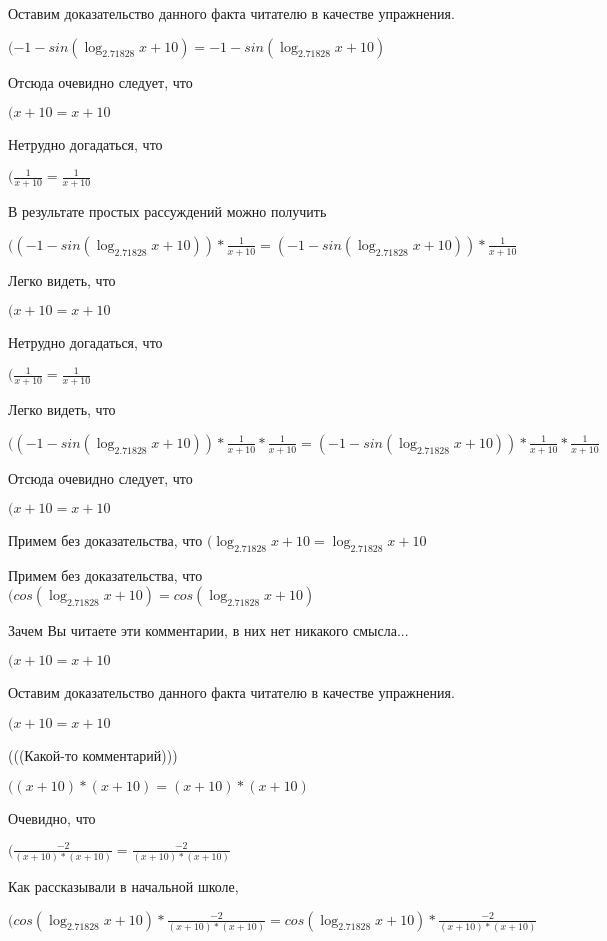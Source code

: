 \documentclass[12pt,a4paper,fleqn]{article}
\theoremstyle{definition}
\begin{document}
Оставим доказательство данного факта читателю в качестве упражнения.

$( -1  - sin(\log_{ 2.71828 }{ x  +  10 }) =  -1  - sin(\log_{ 2.71828 }{ x  +  10 })$

Отсюда очевидно следует, что

$( x  +  10  =  x  +  10 $

Нетрудно догадаться, что

$(\frac{ 1 }{ x  +  10 }
 = \frac{ 1 }{ x  +  10 }
$

В результате простых рассуждений можно получить

$(( -1  - sin(\log_{ 2.71828 }{ x  +  10 })) * \frac{ 1 }{ x  +  10 }
 = ( -1  - sin(\log_{ 2.71828 }{ x  +  10 })) * \frac{ 1 }{ x  +  10 }
$

Легко видеть, что

$( x  +  10  =  x  +  10 $

Нетрудно догадаться, что

$(\frac{ 1 }{ x  +  10 }
 = \frac{ 1 }{ x  +  10 }
$

Легко видеть, что

$(( -1  - sin(\log_{ 2.71828 }{ x  +  10 })) * \frac{ 1 }{ x  +  10 }
 * \frac{ 1 }{ x  +  10 }
 = ( -1  - sin(\log_{ 2.71828 }{ x  +  10 })) * \frac{ 1 }{ x  +  10 }
 * \frac{ 1 }{ x  +  10 }
$

Отсюда очевидно следует, что

$( x  +  10  =  x  +  10 $

Примем без доказательства, что
$(\log_{ 2.71828 }{ x  +  10 } = \log_{ 2.71828 }{ x  +  10 }$

Примем без доказательства, что
$(cos(\log_{ 2.71828 }{ x  +  10 }) = cos(\log_{ 2.71828 }{ x  +  10 })$

Зачем Вы читаете эти комментарии, в них нет никакого смысла...

$( x  +  10  =  x  +  10 $

Оставим доказательство данного факта читателю в качестве упражнения.

$( x  +  10  =  x  +  10 $

(((Какой-то комментарий)))

$(( x  +  10 ) * ( x  +  10 ) = ( x  +  10 ) * ( x  +  10 )$

Очевидно, что

$(\frac{ -2 }{( x  +  10 ) * ( x  +  10 )}
 = \frac{ -2 }{( x  +  10 ) * ( x  +  10 )}
$

Как рассказывали в начальной школе,

$(cos(\log_{ 2.71828 }{ x  +  10 }) * \frac{ -2 }{( x  +  10 ) * ( x  +  10 )}
 = cos(\log_{ 2.71828 }{ x  +  10 }) * \frac{ -2 }{( x  +  10 ) * ( x  +  10 )}
$
\end{document}
